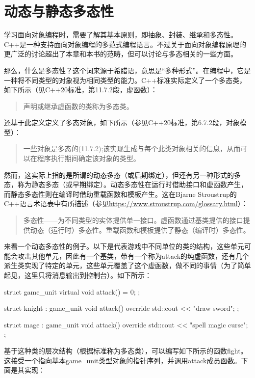 \section{动态与静态多态性}
学习面向对象编程时，需要了解其基本原则，即抽象、封装、继承和多态性。C++是一种支持面向对象编程的多范式编程语言。不过关于面向对象编程原理的更广泛的讨论超出了本章和本书的范畴，但可以讨论与多态相关的一些方面。

那么，什么是多态性？这个词来源于希腊语，意思是“多种形式”。在编程中，它是一种将不同类型的对象视为相同类型的能力。C++标准实际定义了一个多态类，如下所示（见C++20标准，第11.7.2段，虚函数）：

\begin{quote}
声明或继承虚函数的类称为多态类。
\end{quote}

还基于此定义定义了多态对象，如下所示（参见C++20标准，第6.7.2段，对象模型）：

\begin{quote}
一些对象是多态的(11.7.2);该实现生成与每个此类对象相关的信息，从而可以在程序执行期间确定该对象的类型。
\end{quote}

然而，这实际上指的是所谓的动态多态（或后期绑定），但还有另一种形式的多态，称为静态多态（或早期绑定）。动态多态性在运行时借助接口和虚函数产生，而静态多态性则在编译时借助重载函数和模板产生。这在Bjarne Stroustrup的C++语言术语表中有所描述（参见\url{https://www.stroustrup.com/glossary.html}）：

\begin{quote}
多态性——为不同类型的实体提供单一接口。虚函数通过基类提供的接口提供动态（运行时）多态性。重载函数和模板提供了静态（编译时）多态性。
\end{quote}

来看一个动态多态性的例子。以下是代表游戏中不同单位的类的结构，这些单元可能会攻击其他单元，因此有一个基类，带有一个称为attack的纯虚函数，还有几个派生类实现了特定的单元，这些单元覆盖了这个虚函数，做不同的事情（为了简单起见，这里只将消息输出到控制台）。如下所示：

\begin{cpp}
struct game_unit
{
	virtual void attack() = 0;
};

struct knight : game_unit
{
	void attack() override
	{ std::cout << "draw sword\n"; }
};

struct mage : game_unit
{
	void attack() override
	{ std::cout << "spell magic curse\n"; }
};
\end{cpp}

基于这种类的层次结构（根据标准称为多态类），可以编写如下所示的函数fight。这接受一个指向基本game\_unit类型对象的指针序列，并调用attack成员函数。下面是其实现：

